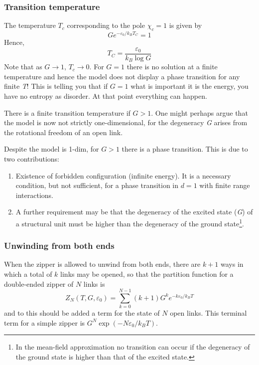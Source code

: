 \documentclass[../main/main.tex]{subfiles}
\begin{document}
\subsubsection{Transition temperature}
The temperature \( T_c \) corresponding to the pole \( \chi_c =1 \) is given by 
  \begin{equation*}
    G e^{-\varepsilon _0 /k_B T_C}  = 1
  \end{equation*}
Hence,
\begin{equation}
  T_C = \frac{\varepsilon _0}{k_B \log{G} }
\end{equation}
Note that as \( G \rightarrow 1 \), \( T_c \rightarrow 0 \). For \( G=1 \) there is no solution at a finite temperature and hence the model does not display a phase transition for any finite \emph{T}! This is telling you that if \( G=1 \) what is important it is the energy, you have no entropy as disorder. At that point everything can happen.

There is a finite transition temperature if \(G>1\). One might perhaps argue that the model is now not strictly one-dimensional, for the degeneracy \emph{G} arises from the rotational freedom of an open link.
\begin{remark}
Despite the model is 1-dim, for \( G>1 \) there is a phase transition. This is due to two contributions:
\begin{enumerate}
\item Existence of forbidden configuration (infinite energy). It is a necessary condition, but not sufficient, for a phase transition in \( d=1 \) with finite range interactions.
\item A further requirement may be that the degeneracy of the excited state (\emph{G}) of a structural unit must be higher than the degeneracy of the ground state\footnote{In the mean-field approximation no transition can occur if the degeneracy of the ground state is higher than that of the excited state.}.
\end{enumerate}
\end{remark}
\subsubsection{Unwinding from both ends}
When the zipper is allowed to unwind from both ends, there are \(k+1\) ways in which a total of \(k\) links may be opened, so that the partition function for a double-ended zipper of \(N\) links is
\begin{equation}
  Z_N (T,G, \varepsilon _0) = \sum_{k=0}^{N-1}  (k+1) G^k e^{-k \varepsilon _0/k_B T} 
\end{equation}
and to this should be added a term for the state of \(N\) open links. This terminal term for a simple zipper is \( G^N \exp(-N \varepsilon_0/ k_B T) \).
\end{document}
